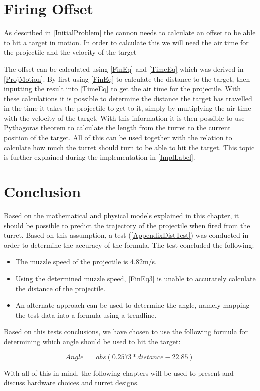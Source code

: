 \section{Firing Offset}
As described in \autoref{InitialProblem} the cannon needs to calculate an
offset to be able to hit a target in motion. In order to calculate this we will
need the air time for the projectile and the velocity of the target\nl

The offset can be calculated using \autoref{FinEq} and \autoref{TimeEq} which
was derived in \autoref{ProjMotion}. By first using \autoref{FinEq} to
calculate the distance to the target, then inputting the result into
\autoref{TimeEq} to get the air time for the projectile. With these calculations
it is possible to determine the distance the target has travelled in the time it
takes the projectile to get to it, simply by multiplying the air time with the
velocity of the target. With this information it is then possible to use
Pythagoras theorem to calculate the length from the turret to the current
position of the target. All of this can be used together with the
 relation to calculate how much the turret
should turn to be able to hit the target. This topic is further explained during the implementation in
\autoref{ImplLabel}.

\section{Conclusion}
Based on the mathematical and physical models explained in this chapter, it
should be possible to predict the trajectory of the projectile when fired from
the turret. Based on this assumption, a test (\autoref{AppendixDistTest}) was
conducted in order to determine the accuracy of the formula. The test concluded
the following:
\begin{itemize}
  \item The muzzle speed of the projectile is 4.82m/s.
  \item Using the determined muzzle speed, \autoref{FinEq3} is unable to
  accurately calculate the distance of the projectile.
  \item An alternate approach can be used to determine the angle, namely mapping
  the test data into a formula using a trendline.  
\end{itemize}

Based on this tests conclusions, we have chosen to use the following formula for
determining which angle should be used to hit the target:

\begin{equation}\label{angleCalc}
Angle\ =\ abs(0.2573 * distance - 22.85)
\end{equation}


With all of this in mind, the following chapters will be used to present
and discuss hardware choices and turret designs.
